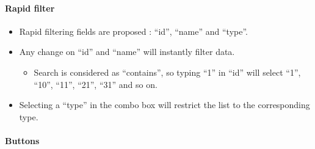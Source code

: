 \documentclass[letterpaper,10pt,english]{sphinxmanual}
\begin{document}
\paragraph{Rapid filter}
\begin{itemize}
\item {} 
Rapid filtering fields are proposed : “id”, “name” and “type”.

\item {} 
Any change on “id” and “name” will instantly filter data.
\begin{itemize}
\item {} 
Search is considered as “contains”, so typing “1” in “id” will select “1”, “10”, “11”, “21”, “31” and so on.

\end{itemize}

\item {} 
Selecting a “type” in the combo box will restrict the list to the corresponding type.

\end{itemize}
\newpage\paragraph{Buttons}
\end{document}
